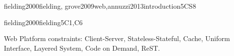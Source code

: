 \begin{syllabus}
\begin{unit}{\PBDIntroduction}{}{fielding2000fielding, grove2009web,annuzzi2013introduction}{5}{CS8}
\begin{topics}%
    \item \PBDIntroductionTopicOverview
    \item \PBDIntroductionTopicProgramming
    \item \PBDIntroductionTopicOverviewOf
    \item \PBDIntroductionTopicProgrammingUnder
\end{topics}
\begin{learningoutcomes}
    \item \PBDIntroductionLODescribeHowDevelopment [\Familiarity]
    \item \PBDIntroductionLOListCharacteristics [\Familiarity]
    \item \PBDIntroductionLOWriteAnd [\Familiarity]
    \item \PBDIntroductionLOListTheDisadvantages [\Familiarity]
\end{learningoutcomes}
\end{unit}



\begin{unit}{\PBDWebPlatforms}{}{fielding2000fielding}{5}{C1,C6}
\begin{topics}%
    \item \PBDWebPlatformsTopicWeb
    \item \item Web Platform constraints: Client-Server, Stateless-Stateful, Cache, Uniform Interface, Layered System, Code on Demand, ReST.
    \item \PBDWebPlatformsTopicWebPlatform
    \item \PBDWebPlatformsTopicSoftware
    \item \PBDWebPlatformsTopicWebStandards
\end{topics}
\begin{learningoutcomes}
    \item \PBDWebPlatformsLODesignAndSimple [\Familiarity]
    \item \PBDWebPlatformsLODescribeTheTheOn [\Familiarity]
    \item \PBDWebPlatformsLOCompareAndProgramming [\Familiarity]
    \item \PBDWebPlatformsLODescribeTheSoftware [\Familiarity]
    \item \PBDWebPlatformsLODiscussHowImpact [\Familiarity]
    \item \PBDWebPlatformsLOReview [\Familiarity]
\end{learningoutcomes}
\end{unit}



\end{syllabus}
